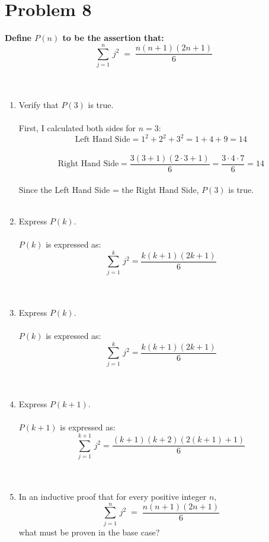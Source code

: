 \documentclass{amsart}
\theoremstyle{definition}
\theoremstyle{Exercise}
\theoremstyle{remark}
\theoremstyle{rule}
\numberwithin{equation}{section}
\begin{document}
\section*{Problem 8}
{\bf Define $P(n)$ to be the assertion that:}\\
\[\displaystyle \sum_{j=1}^{n}\, j^2 \;=\;\frac{n(n+1)(2n+1)}{6}\]\\\\
\begin{enumerate}[label=(\alph*)]
  \item Verify that $P(3)$ is true.\\\\
    First, I calculated both sides for $n=3$: \\
   \[\text{Left Hand Side} = 1^2 + 2^2 + 3^2 = 1 + 4 + 9 = 14\] \\
   \[\text{Right Hand Side} = \frac{3(3+1)(2 \cdot 3+1)}{6} = \frac{3 \cdot 4 \cdot 7}{6} = 14\] \\
   Since the Left Hand Side = the Right Hand Side, $P(3)$ is true. \\\\
  \item Express $P(k)$.\\\\
   $P(k)$ is expressed as: \\
   \[\sum_{j=1}^{k}\, j^2 = \frac{k(k+1)(2k+1)}{6}\]
   \\\\
  \item Express $P(k)$.\\\\
    $P(k)$ is expressed as: \\
   \[\sum_{j=1}^{k}\, j^2 = \frac{k(k+1)(2k+1)}{6}\]
   \\\\
  \item Express $P(k+1)$.\\\\
    $P(k+1)$ is expressed as: \\
   \[\sum_{j=1}^{k+1}\, j^2 = \frac{(k+1)(k+2)(2(k+1)+1)}{6}\]
   \\\\
   \item In an inductive proof that for every positive integer $n$,
   \[\displaystyle \sum_{j=1}^{n}\, j^2 \;=\;\frac{n(n+1)(2n+1)}{6}\]
   what must be proven in the base case?\\\\

\end{enumerate}
\end{document}
